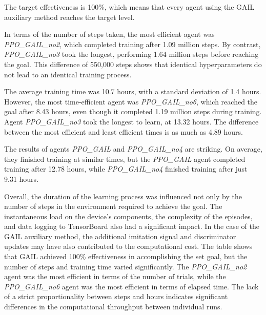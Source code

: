 The target effectiveness is 100\%, which means that every agent using the GAIL auxiliary method reaches the target level.

In terms of the number of steps taken, the most efficient agent was \textit{PPO\_GAIL\_no2}, which completed training after 1.09 million steps. By contrast, \textit{PPO\_GAIL\_no3} took the longest, performing 1.64 million steps before reaching the goal. This difference of 550,000 steps shows that identical hyperparameters do not lead to an identical training process.

The average training time was 10.7 hours, with a standard deviation of 1.4 hours. However, the most time-efficient agent was \textit{PPO\_GAIL\_no6}, which reached the goal after 8.43 hours, even though it completed 1.19 million steps during training. Agent \textit{PPO\_GAIL\_no3} took the longest to learn, at 13.32 hours. The difference between the most efficient and least efficient times is as much as 4.89 hours.

The results of agents \textit{PPO\_GAIL} and \textit{PPO\_GAIL\_no4} are striking. On average, they finished training at similar times, but the \textit{PPO\_GAIL} agent completed training after 12.78 hours, while \textit{PPO\_GAIL\_no4} finished training after just 9.31 hours. 

Overall, the duration of the learning process was influenced not only by the number of steps in the environment required to achieve the goal. The instantaneous load on the device’s components, the complexity of the episodes, and data logging to TensorBoard also had a significant impact. In the case of the GAIL auxiliary method, the additional imitation signal and discriminator updates may have also contributed to the computational cost.
The table shows that GAIL achieved 100\% effectiveness in accomplishing the set goal, but the number of steps and training time varied significantly. The \textit{PPO\_GAIL\_no2} agent was the most efficient in terms of the number of trials, while the \textit{PPO\_GAIL\_no6} agent was the most efficient in terms of elapsed time. The lack of a strict proportionality between steps and hours indicates significant differences in the computational throughput between individual runs.
